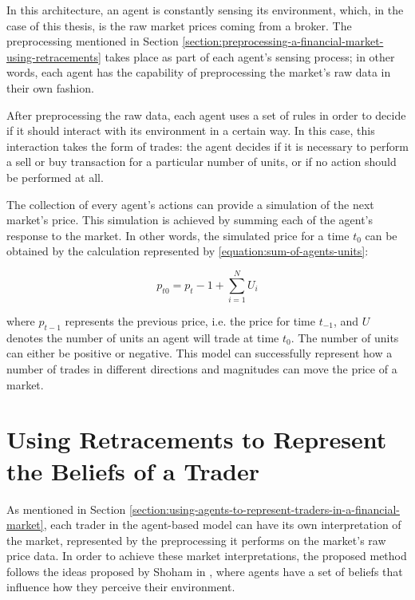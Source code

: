 In this architecture, an agent is constantly sensing its environment, which, in
the case of this thesis, is the raw market prices coming from a broker. The
preprocessing mentioned in Section
\ref{section:preprocessing-a-financial-market-using-retracements} takes place as
part of each agent's sensing process; in other words, each agent has the
capability of preprocessing the market's raw data in their own fashion.

After preprocessing the raw data, each agent uses a set of rules in order to
decide if it should interact with its environment in a certain way. In this
case, this interaction takes the form of trades: the agent decides if it is
necessary to perform a sell or buy transaction for a particular number of units,
or if no action should be performed at all.

The collection of every agent's actions can provide a simulation of the next
market's price. This simulation is achieved by summing each of the agent's
response to the market. In other words, the simulated price for a time $t_0$ can
be obtained by the calculation represented by \ref{equation:sum-of-agents-units}:

\begin{equation}
  \label{equation:sum-of-agents-units}
  p_{t0} = p_t-1 + \sum_{i=1}^{N} U_i
\end{equation}

where $p_{t-1}$ represents the previous price, i.e. the price for time $t_{-1}$, and
$U$ denotes the number of units an agent will trade at time $t_0$. The number of
units can either be positive or negative. This model can successfully represent
how a number of trades in different directions and magnitudes can move the price
of a market.

\section{Using Retracements to Represent the Beliefs of a Trader}
\label{section:using-retracements-to-represent-the-beliefs-of-a-trader}

As mentioned in Section
\ref{section:using-agents-to-represent-traders-in-a-financial-market}, each
trader in the agent-based model can have its own interpretation of the market,
represented by the preprocessing it performs on the market's raw price data. In
order to achieve these market interpretations, the proposed method follows the
ideas proposed by Shoham in \cite{Shoham1993}, where agents have a set of
beliefs that influence how they perceive their environment.

